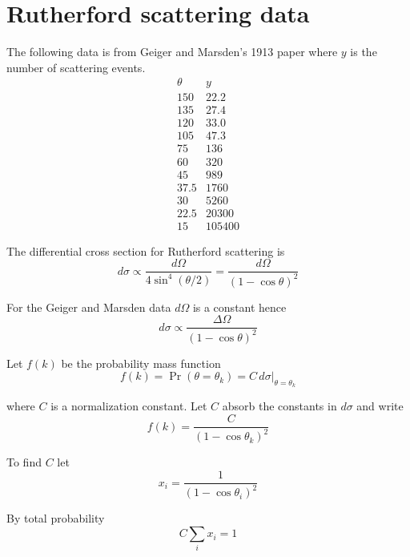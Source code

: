 

\section*{Rutherford scattering data}

The following data is from Geiger and Marsden's 1913 paper
where $y$ is the number of scattering events.
\begin{equation*}
\begin{matrix}
\theta & y\\
150 & 22.2\\
135 & 27.4\\
120 & 33.0\\
105 & 47.3\\
75 & 136\\
60 & 320\\
45 & 989\\
37.5 & 1760\\
30 & 5260\\
22.5 & 20300\\
15 & 105400
\end{matrix}
\end{equation*}

The differential cross section for Rutherford scattering is
\begin{equation*}
d\sigma\propto\frac{d\Omega}{4\sin^4(\theta/2)}
=\frac{d\Omega}{(1-\cos\theta)^2}
\end{equation*}

For the Geiger and Marsden data $d\Omega$ is a constant hence
\begin{equation*}
d\sigma\propto\frac{\Delta\Omega}{(1-\cos\theta)^2}
\end{equation*}

Let $f(k)$ be the probability mass function
\begin{equation*}
f(k)=\Pr(\theta=\theta_k)=C\,d\sigma\big|_{\theta=\theta_k}
\end{equation*}

where $C$ is a normalization constant.
Let $C$ absorb the constants in $d\sigma$ and write
\begin{equation*}
f(k)=\frac{C}{(1-\cos\theta_k)^2}
\end{equation*}

To find $C$ let
\begin{equation*}
x_i=\frac{1}{(1-\cos\theta_i)^2}
\end{equation*}

By total probability
\begin{equation*}
C\sum_i x_i=1
\end{equation*}

